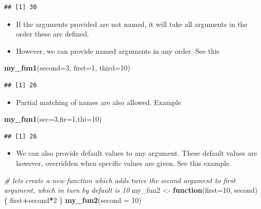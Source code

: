 \documentclass[
]{book}
\newenvironment{Shaded}{\begin{snugshade}}{\end{snugshade}}
\newcommand{\AttributeTok}[1]{\textcolor[rgb]{0.13,0.29,0.53}{#1}}
\newcommand{\CommentTok}[1]{\textcolor[rgb]{0.56,0.35,0.01}{\textit{#1}}}
\newcommand{\ControlFlowTok}[1]{\textcolor[rgb]{0.13,0.29,0.53}{\textbf{#1}}}
\newcommand{\DecValTok}[1]{\textcolor[rgb]{0.00,0.00,0.81}{#1}}
\newcommand{\FunctionTok}[1]{\textcolor[rgb]{0.13,0.29,0.53}{\textbf{#1}}}
\newcommand{\NormalTok}[1]{#1}
\newcommand{\OtherTok}[1]{\textcolor[rgb]{0.56,0.35,0.01}{#1}}
\newcommand{\SpecialCharTok}[1]{\textcolor[rgb]{0.81,0.36,0.00}{\textbf{#1}}}
\providecommand{\tightlist}{%
  \setlength{\itemsep}{0pt}\setlength{\parskip}{0pt}}
\begin{document}
\begin{verbatim}
## [1] 30
\end{verbatim}

\begin{itemize}
\tightlist
\item
  If the arguments provided are not named, it will take all arguments in the order these are defined.
\item
  However, we can provide named arguments in any order. See this
\end{itemize}

\begin{Shaded}
\begin{Highlighting}[]
\FunctionTok{my\_fun1}\NormalTok{(}\AttributeTok{second=}\DecValTok{3}\NormalTok{, }\AttributeTok{first=}\DecValTok{1}\NormalTok{, }\AttributeTok{third=}\DecValTok{10}\NormalTok{)}
\end{Highlighting}
\end{Shaded}

\begin{verbatim}
## [1] 26
\end{verbatim}

\begin{itemize}
\tightlist
\item
  Partial matching of names are also allowed. Example
\end{itemize}

\begin{Shaded}
\begin{Highlighting}[]
\FunctionTok{my\_fun1}\NormalTok{(}\AttributeTok{sec=}\DecValTok{3}\NormalTok{,}\AttributeTok{fir=}\DecValTok{1}\NormalTok{,}\AttributeTok{thi=}\DecValTok{10}\NormalTok{)}
\end{Highlighting}
\end{Shaded}

\begin{verbatim}
## [1] 26
\end{verbatim}

\begin{itemize}
\tightlist
\item
  We can also provide default values to any argument. These default values are however, overridden when specific values are given. See this example.
\end{itemize}

\begin{Shaded}
\begin{Highlighting}[]
\CommentTok{\# let\textquotesingle{}s create a new function which adds twice the second argument to first argument, which in turn by default is 10}
\NormalTok{my\_fun2 }\OtherTok{\textless{}{-}} \ControlFlowTok{function}\NormalTok{(}\AttributeTok{first=}\DecValTok{10}\NormalTok{, second)\{}
\NormalTok{  first}\SpecialCharTok{+}\NormalTok{second}\SpecialCharTok{*}\DecValTok{2}
\NormalTok{\}}
\FunctionTok{my\_fun2}\NormalTok{(}\AttributeTok{second =} \DecValTok{10}\NormalTok{)}
\end{Highlighting}
\end{Shaded}
\end{document}
